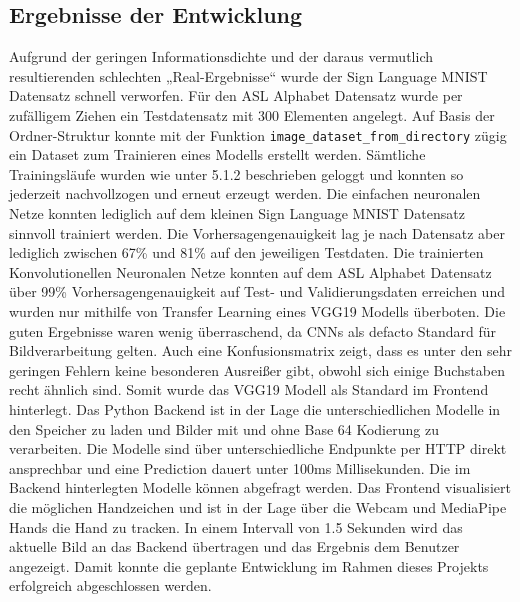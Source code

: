 \documentclass[11pt,bibliography=totocnumbered]{scrartcl}
\begin{document}
\subsection{Ergebnisse der Entwicklung}
Aufgrund der geringen Informationsdichte und der daraus vermutlich resultierenden schlechten „Real-Ergebnisse“ wurde der Sign Language MNIST Datensatz schnell verworfen. Für den ASL Alphabet Datensatz wurde per zufälligem Ziehen ein Testdatensatz mit 300 Elementen angelegt. Auf Basis der Ordner-Struktur konnte mit der Funktion \lstinline[language=pythoninline]|image_dataset_from_directory| zügig ein Dataset zum Trainieren eines Modells erstellt werden. Sämtliche Trainingsläufe wurden wie unter 5.1.2 beschrieben geloggt und konnten so jederzeit nachvollzogen und erneut erzeugt werden. Die einfachen neuronalen Netze konnten lediglich auf dem kleinen Sign Language MNIST Datensatz sinnvoll trainiert werden. Die Vorhersagengenauigkeit lag je nach Datensatz aber lediglich zwischen 67\% und 81\% auf den jeweiligen Testdaten. Die trainierten Konvolutionellen Neuronalen Netze konnten auf dem ASL Alphabet Datensatz über 99\% Vorhersagengenauigkeit auf Test- und Validierungsdaten erreichen und wurden nur mithilfe von Transfer Learning eines VGG19 Modells überboten. Die guten Ergebnisse waren wenig überraschend, da CNNs als defacto Standard für Bildverarbeitung gelten. Auch eine Konfusionsmatrix zeigt, dass es unter den sehr geringen Fehlern keine besonderen Ausreißer gibt, obwohl sich einige Buchstaben recht ähnlich sind.  Somit wurde das VGG19 Modell als Standard im Frontend hinterlegt. Das Python Backend ist in der Lage die unterschiedlichen Modelle in den Speicher zu laden und Bilder mit und ohne Base 64 Kodierung zu verarbeiten. Die Modelle sind über unterschiedliche Endpunkte per HTTP direkt ansprechbar und eine Prediction dauert unter 100ms Millisekunden. Die im Backend hinterlegten Modelle können abgefragt werden.  Das Frontend visualisiert die möglichen Handzeichen und ist in der Lage über die Webcam und MediaPipe Hands die Hand zu tracken. In einem Intervall von 1.5 Sekunden wird das aktuelle Bild an das Backend übertragen und das Ergebnis dem Benutzer angezeigt. Damit konnte die geplante Entwicklung im Rahmen dieses Projekts erfolgreich abgeschlossen werden.
\end{document}
